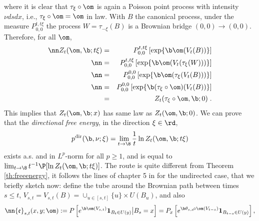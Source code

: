 where it is clear that $\tau_\xi \circ \om$ is again a Poisson point process with intensity $\nu ds dx$,
i.e., $\tau_\xi \circ \om=\om$ in law. With $B$ the canonical process, under the measure $P_{0,0}^{t,t\xi}$
the process 
$W=\tau_{-\xi}(B)$
is a Brownian bridge $(0,0) \to (0,0)$. Therefore, for all $\om$,
\begin{eqnarray} \nn
Z_t(\om, \b; t\xi) &=&  P_{0,0}^{t,t\xi}\left[ \exp \{ \b \om(V_t (B) )\}\right] \\ \nn
&=&  P_{0,0}^{t,t\xi}\left[ \exp \{ \b \om(V_t (\tau_{\xi} (W)) )\}\right] \\ \nn
&=&  P_{0,0}^{0,0}\left[ \exp \{ \b \om(\tau_{\xi} (V_t (B))) \}\right] \\ \nn
&=&  P_{0,0}^{0,0}\left[ \exp \{ \b (\tau_{\xi} \circ \om)(V_t (B)) \}\right] \\ \label{eq:CMBB}
&=& Z_t(\tau_{\xi} \circ \om, \b; 0)\;.
\end{eqnarray}
This implies that $Z_t(\om, \b; x)$ has same law as $Z_t(\om, \b; 0)$.
% 
%
We can prove that the {\em directional free energy},  in the direction $\xi \in \rd$, 
$$ p^{\rm dir}(\b, \nu; \xi ) =  \lim_{t \to \8} \frac{1}{t} \ln Z_t (\om, \b; t\xi)
$$
exists a.s. and in $L^p$-norm for all $p \geq 1$, and is equal to
$
\lim_{t \to \8}  t^{-1}\P[\ln Z_t(\om, \b; t \xi)]
$. The route is quite different from  Theorem \ref{th:freeenergy}, it follows the lines of chapter 5 in \cite{Sznitman} for the undirected case, that we briefly sketch now:
define the tube around the Brownian path between times $s \leq t$,  $V_{s,t}=V_{s,t}(B)=\cup_{u \in [s,t]} \{u\}\times U(B_u)$, and also
\begin{equation}\nn
{\mathfrak e}_{s,t}(x,y;\om) := P\left[ e^{\b \om(V_{s,t})} {\bf 1}_{B_t \in U(y)} \big\vert B_s=x\right] = P_{x} \left[ e^{\b \theta_{s,x} \!\circ \om(V_{t-s})} {\bf 1}_{B_{t-s} \in U(y)} \right],
\end{equation}
